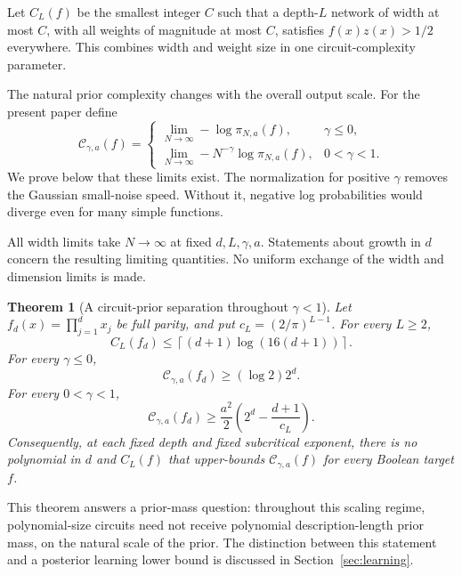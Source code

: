 \documentclass[11pt]{article}
\newtheorem{theorem}{Theorem}[section]
\theoremstyle{remark}
\begin{document}
Let $C_L(f)$ be the smallest integer $C$ such that a depth-$L$
network of width at most $C$, with all weights of magnitude at most
$C$, satisfies $f(x)z(x)>1/2$ everywhere. This combines width and
weight size in one circuit-complexity parameter.

The natural prior complexity changes with the overall output
scale. For the present paper define
\begin{equation}\label{eq:complexity}
 \mathcal C_{\gamma,a}(f)=
 \begin{cases}
 \displaystyle\lim_{N\to\infty}-\log\pi_{N,a}(f),&\gamma\le0,\\[4pt]
 \displaystyle\lim_{N\to\infty}-N^{-\gamma}\log\pi_{N,a}(f),
          &0<\gamma<1.
 \end{cases}
\end{equation}
We prove below that these limits exist. The normalization for
positive $\gamma$ removes the Gaussian small-noise speed. Without
it, negative log probabilities would diverge even for many simple
functions.

All width limits take $N\to\infty$ at fixed $d,L,\gamma,a$.
Statements about growth in $d$ concern the resulting limiting
quantities. No uniform exchange of the width and dimension limits
is made.

\begin{theorem}[A circuit-prior separation throughout $\gamma<1$]
\label{thm:main}
Let $f_d(x)=\prod_{j=1}^d x_j$ be full parity, and put
$c_L=(2/\pi)^{L-1}$. For every $L\ge2$,
\begin{equation}\label{eq:circuit-bound}
 C_L(f_d)\le \left\lceil(d+1)\log(16(d+1))\right\rceil.
\end{equation}
For every $\gamma\le0$,
\begin{equation}\label{eq:nonpositive-bound}
 \mathcal C_{\gamma,a}(f_d)\ge (\log2)2^d.
\end{equation}
For every $0<\gamma<1$,
\begin{equation}\label{eq:positive-bound}
 \mathcal C_{\gamma,a}(f_d)
 \ge \frac{a^2}{2}\left(2^d-\frac{d+1}{c_L}\right).
\end{equation}
Consequently, at each fixed depth and fixed subcritical exponent,
there is no polynomial in $d$ and $C_L(f)$ that upper-bounds
$\mathcal C_{\gamma,a}(f)$ for every Boolean target $f$.
\end{theorem}

This theorem answers a prior-mass question: throughout this scaling
regime, polynomial-size circuits need not receive polynomial
description-length prior mass, on the natural scale of the prior.
The distinction between this statement and a posterior learning
lower bound is discussed in Section~\ref{sec:learning}.
\end{document}
